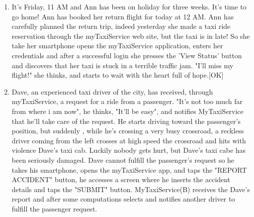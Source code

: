 \documentclass[11pt]{article} %
\begin{document}
\begin{enumerate}
         \item It's Friday, 11 AM and Ann has been on holiday for three weeks. It's time to go home!
           Ann has booked her return flight for today at 12 AM. Ann has carefully planned the return trip, indeed
           yesterday she made a taxi ride reservation through the myTaxiService web site, but the taxi is in late!
           So she take her smartphone opens the myTaxiService application, enters her credentials and after a successful login
           she presses the 'View Status' button and discovers that her taxi is stuck in a terrible traffic jam.
           "I'll miss my flight!" she thinks, and starts to wait with the heart full of hope.[OK]

        \item Dave, an experienced taxi driver of the city, has received, through myTaxiService, a request for a ride
           from a passenger. "It's not too much far from where i am now", he thinks, "It'll be easy", and notifies
           MyTaxiService that he'll take care of the request. He starts driving toward the passenger's position, but suddenly
           , while he's crossing a very busy crossroad,
           a reckless driver coming from the left crosses at high speed the crossroad and hits with violence
           Dave's taxi cab. Luckily nobody gets hurt, but Dave's taxi cabe has been seriously damaged.
           Dave cannot fulfill the passenger's request so he takes his smartphone, opens the myTaxiService app,
           and taps the "REPORT ACCIDENT" button, he accesses a screen where he inserts the accident details and taps the "SUBMIT" button.
           MyTaxiService(B) receives the Dave's report and after some computations selects and notifies another driver to fulfill the passenger request.
           

\end{enumerate}
\end{document}
